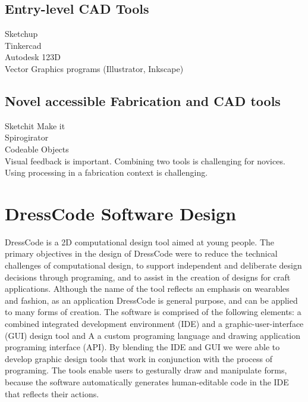 \documentclass{sigchi}
\begin{document}
\subsection{Entry-level CAD Tools}
Sketchup\\
Tinkercad\\
Autodesk 123D\\
Vector Graphics programs (Illustrator, Inkscape)\\
\subsection{Novel accessible Fabrication and CAD tools}
Sketchit Make it\\
Spirogirator\\
Codeable Objects\\

Visual feedback is important. Combining two tools is challenging for novices. Using processing in a fabrication context is challenging.

\section{DressCode Software Design}
DressCode is a 2D computational design tool aimed at young people. The primary objectives in the design of DressCode were to reduce the technical challenges of computational design, to support independent and deliberate design decisions through programing, and to assist in the creation of designs for craft applications. Although the name of the tool reflects an emphasis on wearables and fashion, as an application DressCode is general purpose, and can be applied to many forms of creation. The software is comprised of the following elements: a combined integrated development environment (IDE) and a graphic-user-interface (GUI) design tool and  A a custom programing language and drawing application programing interface (API). By blending the IDE and GUI we were able to develop graphic design tools that work in conjunction with the process of programing. The tools enable users to gesturally draw and manipulate forms, because the software automatically generates human-editable code in the IDE that reflects their actions.
\end{document}
